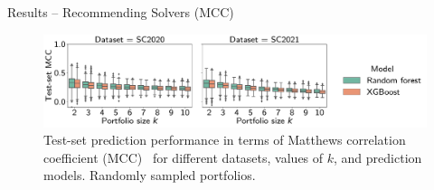 \documentclass[en]{sdqbeamer}
\begin{document}
\begin{frame}[t]{Results -- Recommending Solvers (MCC)}
	\begin{figure}[htb]
		\centering
		\includegraphics[width=\textwidth]{plots/prediction-test-mcc.pdf}
		\caption*{Test-set prediction performance in terms of Matthews correlation coefficient (MCC)~\cite{matthews1975comparison,gorodkin2004comparing} for different datasets, values of $k$, and prediction models. Randomly sampled portfolios.}
	\end{figure}
\end{frame}
\end{document}
